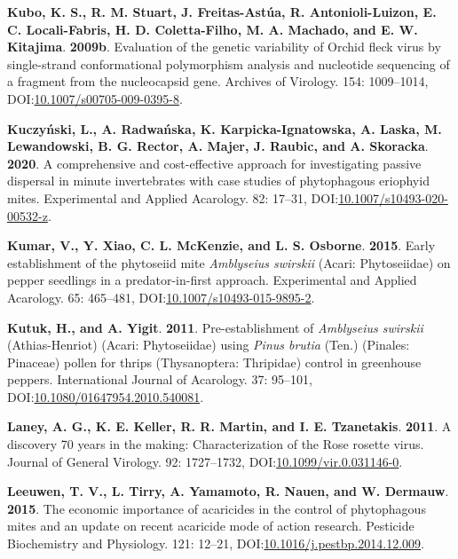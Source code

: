 \documentclass[12pt,final,CPage]{ufthesis}
\newlength{\cslhangindent}
\newenvironment{CSLReferences}[2] %
{%
	\setlength{\parindent}{0pt}
	\ifodd #1 \everypar{\setlength{\hangindent}{\cslhangindent}}\ignorespaces\fi
	\ifnum #2 > 0
	\setlength{\parskip}{#2\baselineskip}
	\fi
}%
{}
\begin{document}
{\begin{CSLReferences}{1}{0}
  \leavevmode{}%
  \textbf{Kubo, K. S., R. M. Stuart, J. Freitas-Astúa, R. Antonioli-Luizon, E. C. Locali-Fabris, H. D. Coletta-Filho, M. A. Machado, and E. W. Kitajima}. \textbf{2009b}. Evaluation of the genetic variability of {Orchid fleck virus} by single-strand conformational polymorphism analysis and nucleotide sequencing of a fragment from the nucleocapsid gene. Archives of Virology. 154: 1009--1014, DOI:\href{https://doi.org/10.1007/s00705-009-0395-8}{10.1007/s00705-009-0395-8}.

  \leavevmode{}%
  \textbf{Kuczyński, L., A. Radwańska, K. Karpicka-Ignatowska, A. Laska, M. Lewandowski, B. G. Rector, A. Majer, J. Raubic, and A. Skoracka}. \textbf{2020}. A comprehensive and cost-effective approach for investigating passive dispersal in minute invertebrates with case studies of phytophagous eriophyid mites. Experimental and Applied Acarology. 82: 17--31, DOI:\href{https://doi.org/10.1007/s10493-020-00532-z}{10.1007/s10493-020-00532-z}.

  \leavevmode{}%
  \textbf{Kumar, V., Y. Xiao, C. L. McKenzie, and L. S. Osborne}. \textbf{2015}. Early establishment of the phytoseiid mite {\emph{Amblyseius swirskii}} ({Acari}: {Phytoseiidae}) on pepper seedlings in a predator-in-first approach. Experimental and Applied Acarology. 65: 465--481, DOI:\href{https://doi.org/10.1007/s10493-015-9895-2}{10.1007/s10493-015-9895-2}.

  \leavevmode{}%
  \textbf{Kutuk, H., and A. Yigit}. \textbf{2011}. Pre-establishment of {\emph{Amblyseius swirskii}} {(Athias-Henriot)} {({Acari}: {Phytoseiidae})} using {\emph{Pinus brutia}} {(Ten.)} {(Pinales: Pinaceae)} pollen for thrips {(Thysanoptera: Thripidae)} control in greenhouse peppers. International Journal of Acarology. 37: 95--101, DOI:\href{https://doi.org/10.1080/01647954.2010.540081}{10.1080/01647954.2010.540081}.

  \leavevmode{}%
  \textbf{Laney, A. G., K. E. Keller, R. R. Martin, and I. E. Tzanetakis}. \textbf{2011}. A discovery 70 years in the making: Characterization of the {Rose rosette virus}. Journal of General Virology. 92: 1727--1732, DOI:\href{https://doi.org/10.1099/vir.0.031146-0}{10.1099/vir.0.031146-0}.

  \leavevmode{}%
  \textbf{Leeuwen, T. V., L. Tirry, A. Yamamoto, R. Nauen, and W. Dermauw}. \textbf{2015}. The economic importance of acaricides in the control of phytophagous mites and an update on recent acaricide mode of action research. Pesticide Biochemistry and Physiology. 121: 12--21, DOI:\href{https://doi.org/10.1016/j.pestbp.2014.12.009}{10.1016/j.pestbp.2014.12.009}.


\end{CSLReferences}}
\end{document}
